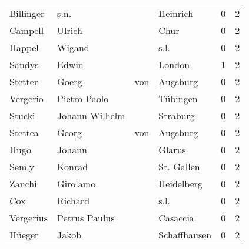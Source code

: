\begin{center}
\begin{tiny}
\begin{longtabu}{llllrr}
                Billinger &                               s.n. &             &                                    Heinrich &          0 &         2 \\
                  Campell &                             Ulrich &             &                                        Chur &          0 &         2 \\
                   Happel &                             Wigand &             &                                        s.l. &          0 &         2 \\
                   Sandys &                              Edwin &             &                                      London &          1 &         2 \\
                  Stetten &                              Goerg &         von &                                    Augsburg &          0 &         2 \\
                 Vergerio &                       Pietro Paolo &             &                                    Tübingen &          0 &         2 \\
                   Stucki &                     Johann Wilhelm &             &                                    Straburg &          0 &         2 \\
                  Stettea &                              Georg &         von &                                    Augsburg &          0 &         2 \\
                     Hugo &                             Johann &             &                                      Glarus &          0 &         2 \\
                    Semly &                             Konrad &             &                                  St. Gallen &          0 &         2 \\
                   Zanchi &                           Girolamo &             &                                  Heidelberg &          0 &         2 \\
                      Cox &                            Richard &             &                                        s.l. &          0 &         2 \\
                Vergerius &                      Petrus Paulus &             &                                    Casaccia &          0 &         2 \\
                   Hüeger &                              Jakob &             &                                Schaffhausen &          0 &         2 \\

\end{longtabu}
\end{tiny}
\end{center}
